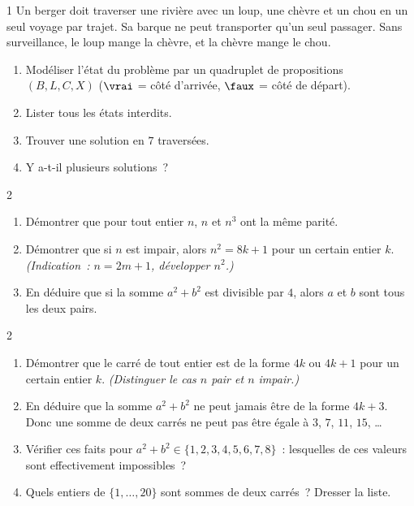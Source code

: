 \begin{probleme}{1}
Un berger doit traverser une rivi\`ere avec un loup, une ch\`evre et un chou
en un seul voyage par trajet. Sa barque ne peut transporter qu'un seul passager.
Sans surveillance, le loup mange la ch\`evre, et la ch\`evre mange le chou.
\begin{enumerate}
  \item Mod\'eliser l'\'etat du probl\`eme par un quadruplet de propositions
        $(B, L, C, X)$ ($\vrai$ = c\^ot\'e d'arriv\'ee, $\faux$ = c\^ot\'e de d\'epart).
  \item Lister tous les \'etats interdits.
  \item Trouver une solution en $7$ traversées.
  \item Y a-t-il plusieurs solutions~?
\end{enumerate}
\end{probleme}

\begin{probleme}{2}
\begin{enumerate}
  \item D\'emontrer que pour tout entier $n$,
        $n$ et $n^3$ ont la m\^eme parit\'e.
  \item D\'emontrer que si $n$ est impair, alors $n^2 = 8k+1$
        pour un certain entier $k$.
        \emph{(Indication~: $n = 2m+1$, d\'evelopper $n^2$.)}
  \item En d\'eduire que si la somme $a^2 + b^2$ est divisible par $4$,
        alors $a$ et $b$ sont tous les deux pairs.
\end{enumerate}
\end{probleme}

\begin{probleme}{2}
\begin{enumerate}
  \item D\'emontrer que le carr\'e de tout entier est de la forme $4k$
        ou $4k+1$ pour un certain entier $k$.
        \emph{(Distinguer le cas $n$ pair et $n$ impair.)}
  \item En d\'eduire que la somme $a^2 + b^2$ ne peut jamais \^etre
        de la forme $4k+3$.
        Donc une somme de deux carr\'es ne peut pas \^etre \'egale \`a
        $3$, $7$, $11$, $15$, \ldots
  \item V\'erifier ces faits pour $a^2+b^2 \in \{1,2,3,4,5,6,7,8\}$~:
        lesquelles de ces valeurs sont effectivement impossibles~?
  \item Quels entiers de $\{1,\ldots,20\}$ sont sommes de deux carr\'es~?
        Dresser la liste.
\end{enumerate}
\end{probleme}

